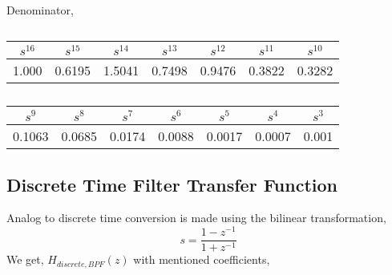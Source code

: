 \documentclass[12pt]{article}
\begin{document}
Denominator,
\begin{table}[H]
\centering  %
\begin{tabular}{|c|c|c|c|c|c|c|}
\hline  %
 $s^{16}$ & $s^{15}$ & $s^{14}$ & $s^{13}$ & $s^{12}$ & $s^{11}$ & $s^{10}$ \\ \hline
1.000 & 0.6195 & 1.5041 &0.7498 & 0.9476 & 0.3822 & 0.3282 \\
\hline    %
\end{tabular}

\centering  %
\begin{tabular}{|c|c|c|c|c|c|c|}
\hline  %
  $s^{9}$ & $s^{8}$ & $s^{7}$ & $s^{6}$ & $s^{5}$ & $s^{4}$ & $s^{3}$ \\ \hline
0.1063 & 0.0685 & 0.0174 &0.0088 & 0.0017 & 0.0007 & 0.001 \\
\hline    %
\end{tabular}

\caption{}
\end{table}



\subsection{Discrete Time Filter Transfer Function}
Analog to discrete time conversion is made using the bilinear transformation,
\begin{equation}
    s = \frac{1-z^{-1}}{1+z^{-1}}
\end{equation}
We get, $H_{discrete,BPF}(z)$ with mentioned coefficients,\\
\newline
\end{document}
